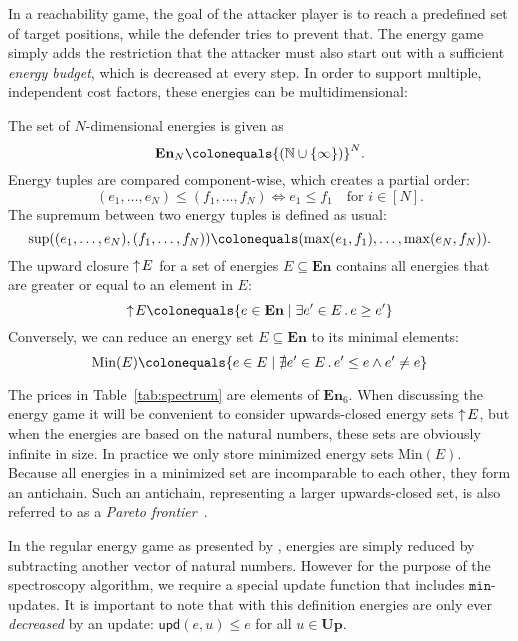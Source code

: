 In a reachability game,
the goal of the attacker player is to reach a predefined set of target positions,
while the defender tries to prevent that.
The energy game simply adds the restriction that the attacker must also start
out with a sufficient \emph{energy budget},
which is decreased at every step.
In order to support multiple, independent cost factors,
these energies can be multidimensional:

\begin{definition}%
    \label{def:energies}
    The set of $N$-dimensional energies is given as
    \[\mathbf{En}_N \colonequals {(\mathbb{N} \cup \{ \infty \})}^N.\]
    Energy tuples are compared component-wise, which creates a partial order:
    \[(e_1, \ldots, e_N) \leq (f_1, \ldots, f_N) \Leftrightarrow e_1 \leq f_1
    \quad \text{for } i \in [N].\]
    The supremum between two energy tuples is defined as usual:
    \[\sup((e_1, \ldots, e_N), (f_1, \ldots, f_N)) \colonequals
        (\max(e_1, f_1), \ldots, \max(e_N, f_N)).\]
    The upward closure $\uparrow\! E$ for a set of energies
    $E \subseteq \mathbf{En}$ contains all energies that are greater or equal
    to an element in $E$:
    \[\upclosed E \colonequals
        \{e \in \mathbf{En} \mid \exists e' \in E\,.\,e \geq e'\}\]
    Conversely, we can reduce an energy set $E \subseteq \mathbf{En}$
    to its minimal elements:
    \[\mathrm{Min} (E) \colonequals
        \{e \in E \mid \nexists e' \in E\,.\,e' \leq e \wedge e' \ne e\}\]
\end{definition}

The prices in Table~\ref{tab:spectrum} are elements of $\mathbf{En}_6$.
When discussing the energy game it will be convenient to consider
upwards-closed energy sets $\uparrow\! E$,
but when the energies are based on the natural numbers,
these sets are obviously infinite in size.
In practice we only store minimized energy sets $\mathrm{Min}(E)$.
Because all energies in a minimized set are incomparable to each other,
they form an antichain.
Such an antichain, representing a larger upwards-closed set,
is also referred to as a \emph{Pareto frontier}~\cite{brihaye2023multi}.

In the regular energy game as presented by \textcite{brihaye2023multi},
energies are simply reduced by subtracting another vector of natural numbers.
However for the purpose of the spectroscopy algorithm,
we require a special update function that includes $\mathtt{min}$-updates.
It is important to note that with this definition energies are only ever
\emph{decreased} by an update:
$\mathsf{upd}(e, u) \leq e$ for all $u \in \mathbf{Up}$.

